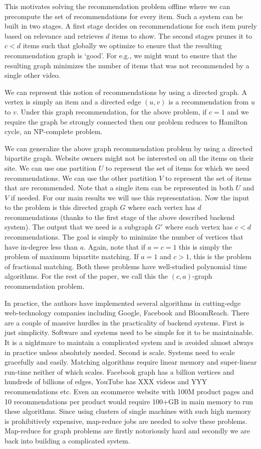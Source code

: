 This motivates solving the recommendation problem offline where we can precompute
the set of recommendations for every item. Such a system can be built in two stages. 
A first stage decides on recommendations for each item purely based on relevance and
retrieves $d$ items to show. The second stages prunes it to $c < d$ items such that
globally we optimize to ensure that the resulting recommendation graph is `good'. For 
e.g., we might want to ensure that the resulting graph minimizes the number of items
that was not recommended by a single other video. 

We can represent this notion of recommendations by using a directed graph. A vertex is simply
an item and a directed edge $(u, v)$ is a recommendation from $u$ to $v$. Under this graph
recommendation, for the above problem, if $c=1$ and we require
the graph be strongly connected then our problem reduces to Hamilton cycle, an NP-complete problem.

We can generalize the above graph recommendation problem by using a directed bipartite graph. 
Website owners might not be interested on all the items on their site. We can use one partition $U$
to represent the set of items for which we need recommendations. We can use the other partition $V$
to represent the set of items that are recommended. Note that a single item can be represented in 
both $U$ and $V$ if needed. For our main results we will use this representation. Now the input
to the problem is this directed graph $G$ where each vertex has $d$ recommendations (thanks to the
first stage of the above described backend system). The output that we need is a subgraph $G'$
where each vertex has $c < d$ recommendations. The goal is simply to minimize the number of vertices
that have in-degree less than $a$. Again, note that if $a=c=1$ this is simply the problem of
maximum bipartite matching\cite{}. If $a=1$ and $c > 1$, this is the problem of fractional
matching\cite{}. Both these problems have well-studied polynomial time algorithms\cite{}. For the
rest of the paper, we call this the $(c, a)$-graph recommendation problem.

In practice, the authors have implemented several algorithms in cutting-edge web-technology companies
including Google, Facebook and BloomReach. There are a couple of massive hurdles in the practicality
of backend systems. First is just simplicity. Software and systems need to be simple for it to be
maintainable. It is a nightmare to maintain a complicated system and is avoided almost always
in practice unless absolutely needed. Second is scale. Systems need to scale gracefully and easily. Matching
algorithms require linear memory and super-linear run-time neither of which scales. Facebook graph has
a billion vertices\cite{} and hundreds of billions of edges\cite{}, 
YouTube has XXX videos and YYY recommendations\cite{} etc. Even an ecommerce website with 100M product
pages and 10 recommendations per product would require 100+GB in main memory to run these algorithms. Since
using clusters of single machines with such high memory is prohibitively expensive, map-reduce\cite{} jobs
are needed to solve these problems. Map-reduce for graph problems are firstly notoriously hard and secondly
we are back into building a complicated system. 

